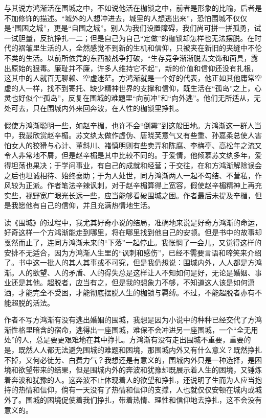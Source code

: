 \documentclass[openany,scheme = chinese, linespread = 1.5]{ctexbook}
\begin{document}
与其说方鸿渐活在围城之中，不如说他活在枷锁之中，前者是形象的比喻，后者是不加修饰的描述。“城外的人想冲进去，城里的人想逃出来”，恐怕围城不仅仅是“围困之城”，更是“自围之城”。别人为我们设置障碍，我们尚可拼一拼孤勇，试一试胆量，反抗挣扎一二；但是自己为自己“定做”的枷锁却怎样也无法摆脱。在时代的褶皱里生活的人，全然感觉不到新的生机和信仰，只被夹在新旧的夹缝中不伦不类的生活。以前所依凭的东西被战争打破，“生存竞争渐渐脱去文饰和面具，露出原始的狠毒。廉耻并不廉，许多人维持它不起”，新的价值和信仰还没有扎根，这其中的人就百无聊赖、空虚迷茫。方鸿渐就是一个好的代表，他正如其他庸常空虚的人一样，找不到寄托、缺少精神世界的支撑和信仰，既生活在“孤岛”之上，心灵也好似个“孤岛”，反复在围城的难题里“向前冲”和“向外逃”。他们无所适从，无处可去，只在围城内外来回奔波，在人性的枷锁里挣扎。

假使方鸿渐聪明一些，如赵辛楣，也许不会“倒霉”到这般田地。方鸿渐这一群人当中，我最欣赏赵辛楣。苏文纨太做作虚伪、唐晓芙意气又有些重、孙嘉柔总使人害怕女人的狡猾与心计、董斜川、褚慎明则有些卖弄和陈腐、李梅亭、高松年之流又令人非常地不屑，但是赵辛楣是其中比较不同的。于爱情，他倾慕苏文纨多年，爱得坦荡也果决；于学问事业，有自己的成就和经营；于交往，在和方鸿渐解除误会之后也坦诚相待、始终襄助；于为人处世，同方鸿渐两人一起不勾结、不营私，作风较为正派。作者笔法辛辣讽刺，对于赵辛楣算得上宽容，假使赵辛楣精神上再充实些，视野宽广眼光长远一些，应当能够看破围城之困。作者最后未提及辛楣，但是我愿他有自己的信仰，并且充满热情地生活。

读《围城》的过程中，我尤其好奇小说的结局，准确地来说是好奇方鸿渐的命运，好奇这样一个方鸿渐能走到哪里，将在哪里找到他自己的安顿。但是书中的故事却戛然而止了，连同方鸿渐未来的“下落”一起停止。我怅惘了一会儿，又觉得这样的安排不无适合，因为方鸿渐人生里的“讽刺和感伤”，已经不需要言语和啼笑来介绍了。书中这一批人的其人其事或不可究，但是我仍想说：围城内外，人人都是方鸿渐。人的欲望、人的矛盾、人的得失总是这样让人不知如何是好，无论是婚姻、事业还是其他。超脱者，应当有之，但是我的想象力不够，不知道这人该是如何潇洒，才能完全不受困，才能彻底摆脱人生的枷锁与羁缚。不过，不能超脱者亦有不能超脱的活法。

作者不写方鸿渐有没有逃出婚姻的围城，我想是因为小说中的种种已经交代了方鸿渐性格里暗含的宿命，逃得出一座围城，难保不会冲进另一座围城，一个“全无用处”的人，总是要更艰难地在其中挣扎。方鸿渐有没有走出围城不重要，重要的是，既然人人都无法避免围城的难题和困境，那围城内外又有什么意义？既然挣扎不掉，又何必徒劳、白费力气？我想还是有意义的，围城内外只是一种选择，是困境和欲望带来的结果，但是围城内外的奔波和犹豫却既展示着人生的困境，又锤炼着奔波和犹豫的人。这奔波不止体现着人的欲望和挣扎，还说明了生而为人应当抱持的热情和信仰，倘有一天没有了热情和信仰的支撑，人也就仅仅安顿在城内或城外了。围城的困境促使着我们挣扎，带着热情、理性和信仰地去挣扎，这不会没有意义的。
\end{document}
